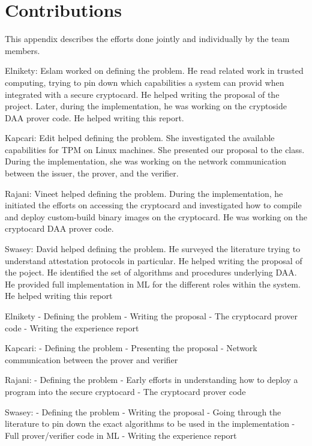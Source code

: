 \section{Contributions}

This appendix describes the efforts done jointly and individually by the team
members.

Elnikety: Eslam worked on defining the problem. He read related work in trusted
computing, trying to pin down which capabilities a system can provid when
integrated with a secure cryptocard. He helped writing the proposal of the
project. Later, during the implementation, he was working on the cryptoside DAA
prover code. He helped writing this report.

Kapcari: Edit helped defining the problem. She investigated the available
capabilities for TPM on Linux machines. She presented our proposal to the class.
During the implementation, she was working on the network communication between
the issuer, the prover, and the verifier.

Rajani: Vineet helped defining the problem. During the implementation, he
initiated the efforts on accessing the cryptocard and investigated how to
compile and deploy custom-build binary images on the cryptocard. He was working
on the cryptocard DAA prover code.

Swasey: David helped defining the problem. He surveyed the literature trying to
understand attestation protocols in particular. He helped writing the proposal
of the poject. He identified the set of algorithms and procedures underlying
DAA. He provided full implementation in ML for the different roles within
the system. He helped writing this report



\begin{comment}
	\emph{EE:} Aniket’s Summary of Contributions (no hosing)
\end{comment}

Elnikety
- Defining the problem
- Writing the proposal
- The cryptocard prover code
- Writing the experience report

Kapcari:
- Defining the problem
- Presenting the proposal
- Network communication between the prover and verifier

Rajani:
- Defining the problem
- Early efforts in understanding how to deploy a program into the secure
cryptocard
- The cryptocard prover code 

Swasey:
- Defining the problem
- Writing the proposal
- Going through the literature to pin down the exact algorithms to be used in
the implementation
- Full prover/verifier code in ML
- Writing the experience report

\fi